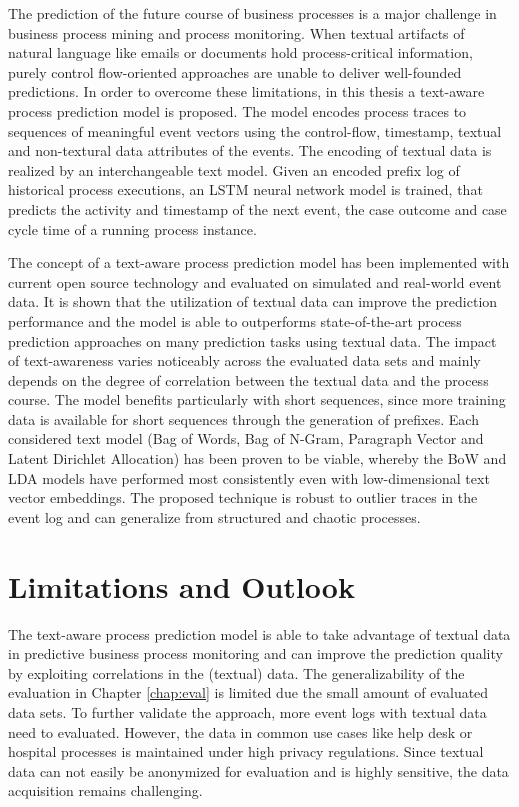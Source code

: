 The prediction of the future course of business processes is a major challenge in business process mining and process monitoring.
When textual artifacts of natural language like emails or documents hold process-critical information, purely control flow-oriented approaches are unable to deliver well-founded predictions.
In order to overcome these limitations, in this thesis a text-aware process prediction model is proposed.
The model encodes process traces to sequences of meaningful event vectors using the control-flow, timestamp, textual and non-textural data attributes of the events.
The encoding of textual data is realized by an interchangeable text model.
Given an encoded prefix log of historical process executions, an LSTM neural network model is trained, that predicts the activity and timestamp of the next event, the case outcome and case cycle time of a running process instance.

The concept of a text-aware process prediction model has been implemented with current open source technology and evaluated on simulated and real-world event data.
It is shown that the utilization of textual data can improve the prediction performance and the model is able to outperforms state-of-the-art process prediction approaches on many prediction tasks using textual data.
The impact of text-awareness varies noticeably across the evaluated data sets and mainly depends on the degree of correlation between the textual data and the process course.
The model benefits particularly with short sequences, since more training data is available for short sequences through the generation of prefixes.
Each considered text model (Bag of Words, Bag of N-Gram, Paragraph Vector and Latent Dirichlet Allocation) has been proven to be viable, whereby the BoW and LDA models have performed most consistently even with low-dimensional text vector embeddings.
The proposed technique is robust to outlier traces in the event log and can generalize from structured and chaotic processes.

\section{Limitations and Outlook}

The text-aware process prediction model is able to take advantage of textual data in predictive business process monitoring and can improve the prediction quality by exploiting correlations in the (textual) data.
The generalizability of the evaluation in Chapter \ref{chap:eval} is limited due the small amount of evaluated data sets.
To further validate the approach, more event logs with textual data need to evaluated.
However, the data in common use cases like help desk or hospital processes is maintained under high privacy regulations.
Since textual data can not easily be anonymized for evaluation and is highly sensitive, the data acquisition remains challenging.

